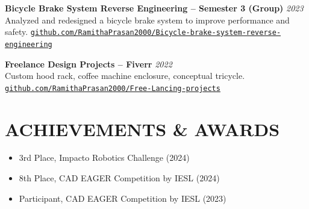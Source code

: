 \documentclass[10pt,a4paper]{article}
\newcommand{\entry}[2]{%
    \textbf{#1} \hfill {\itshape\color{dategray}#2}\\[2pt]
}
\begin{document}
\entry{Bicycle Brake System Reverse Engineering -- Semester 3 (Group)}{2023}
\hspace*{1.5em}Analyzed and redesigned a bicycle brake system to improve performance and safety. \newline
\hspace*{1.5em}\href{https://github.com/RamithaPrasan2000/Bicycle-brake-system-reverse-engineering.git}{\nolinkurl{github.com/RamithaPrasan2000/Bicycle-brake-system-reverse-engineering}}

\entry{Freelance Design Projects -- Fiverr}{2022}
\hspace*{1.5em}Custom hood rack, coffee machine enclosure, conceptual tricycle. \newline
\hspace*{1.5em}\href{https://github.com/RamithaPrasan2000/Free-Lancing-projects.git}{\nolinkurl{github.com/RamithaPrasan2000/Free-Lancing-projects}}

\section{ACHIEVEMENTS \& AWARDS}
\vspace{-2pt}
\begin{itemize}[leftmargin=18pt, itemsep=3pt, topsep=0pt, partopsep=0pt, parsep=0pt]
    \item 3rd Place, Impacto Robotics Challenge (2024)
    \item 8th Place, CAD EAGER Competition by IESL (2024)
    \item Participant, CAD EAGER Competition by IESL (2023)
\end{itemize}
\vspace{7pt}

\end{document}
